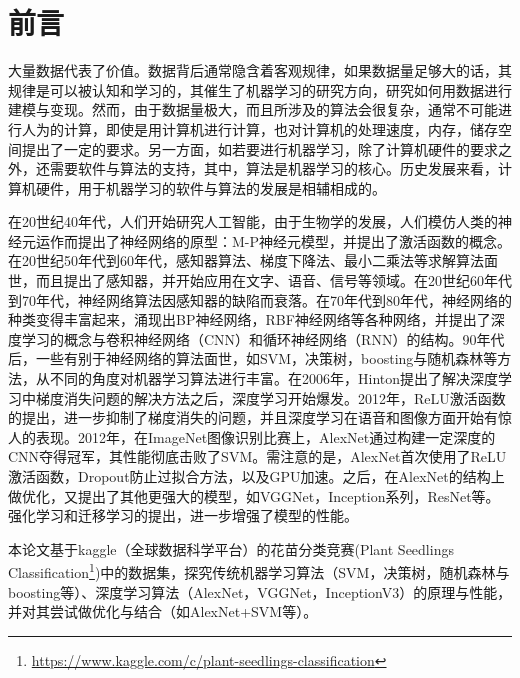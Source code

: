 \section{前言}
大量数据代表了价值。数据背后通常隐含着客观规律，如果数据量足够大的话，其规律是可以被认知和学习的，其催生了机器学习的研究方向，研究如何用数据进行建模与变现。然而，由于数据量极大，而且所涉及的算法会很复杂，通常不可能进行人为的计算，即使是用计算机进行计算，也对计算机的处理速度，内存，储存空间提出了一定的要求。另一方面，如若要进行机器学习，除了计算机硬件的要求之外，还需要软件与算法的支持，其中，算法是机器学习的核心。历史发展来看，计算机硬件，用于机器学习的软件与算法的发展是相辅相成的。

在20世纪40年代，人们开始研究人工智能，由于生物学的发展，人们模仿人类的神经元运作而提出了神经网络的原型：M-P神经元模型，并提出了激活函数的概念。在20世纪50年代到60年代，感知器算法、梯度下降法、最小二乘法等求解算法面世，而且提出了感知器，并开始应用在文字、语音、信号等领域。在20世纪60年代到70年代，神经网络算法因感知器的缺陷而衰落。在70年代到80年代，神经网络的种类变得丰富起来，涌现出BP神经网络，RBF神经网络等各种网络，并提出了深度学习的概念与卷积神经网络（CNN）和循环神经网络（RNN）的结构。90年代后，一些有别于神经网络的算法面世，如SVM，决策树，boosting与随机森林等方法，从不同的角度对机器学习算法进行丰富。在2006年，Hinton提出了解决深度学习中梯度消失问题的解决方法之后，深度学习开始爆发。2012年，ReLU激活函数的提出，进一步抑制了梯度消失的问题，并且深度学习在语音和图像方面开始有惊人的表现。2012年，在ImageNet图像识别比赛上，AlexNet通过构建一定深度的CNN夺得冠军，其性能彻底击败了SVM。需注意的是，AlexNet首次使用了ReLU激活函数，Dropout防止过拟合方法，以及GPU加速。之后，在AlexNet的结构上做优化，又提出了其他更强大的模型，如VGGNet，Inception系列，ResNet等。强化学习和迁移学习的提出，进一步增强了模型的性能。

本论文基于kaggle（全球数据科学平台）的花苗分类竞赛(Plant Seedlings Classification\footnote{\url{https://www.kaggle.com/c/plant-seedlings-classification}})中的数据集，探究传统机器学习算法（SVM，决策树，随机森林与boosting等）、深度学习算法（AlexNet，VGGNet，InceptionV3）的原理与性能，并对其尝试做优化与结合（如AlexNet+SVM等）。
